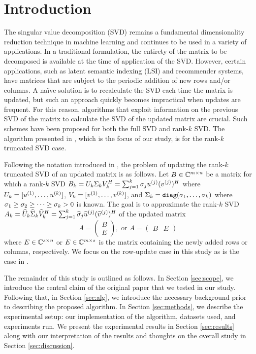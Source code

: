 
\section{Introduction} \label{sec:intro}

The singular value decomposition (SVD) remains a fundamental dimensionality reduction technique in machine learning and continues to be used in a variety of applications.
In a traditional formulation, the entirety of the matrix to be decomposed is available at the time of application of the SVD. However, certain applications, such as latent semantic indexing (LSI) and recommender systems, have matrices that are subject to the periodic addition of new rows and/or columns.
A na\"{i}ve solution is to recalculate the SVD each time the matrix is updated, but such an approach quickly becomes impractical when updates are frequent.
For this reason, algorithms that exploit information on the previous SVD of the matrix to calculate the SVD of the updated matrix are crucial.
Such schemes have been proposed for both the full SVD and rank-$k$ SVD.
The algorithm presented in \cite{Kalantzis2021}, which is the focus of our study, is for the rank-$k$ truncated SVD case.

Following the notation introduced in \cite{Kalantzis2021}, the problem of updating the rank-$k$ truncated SVD of an updated matrix is as follows.
Let $B\in\mathbb{C}^{m\times n}$ be a matrix for which a rank-$k$ SVD $B_k = U_k \Sigma_k V_k^H = \sum_{j=1}^k \sigma_{j} u^{(j)} (v^{(j)})^H$ where $U_k = [u^{(1)}, \dots, u^{(k)}]$, $V_k = [v^{(1)}, \dots, v^{(k)}]$, and $\Sigk = \verb|diag| (\sigj{1}, \dots, \sigj{k})$ where $\sigma_{1} \geq \sigma_{2} \geq \dots \geq \sigma_{k} > 0$ is known.
The goal is to approximate the rank-$k$ SVD $A_k = {\widehat{U}}_k {\widehat{\Sigma}}_k {\widehat{V}}_k^H = \sum_{j=1}^k \widehat{\sigma}_{j} \widehat{u}^{(j)} (\widehat{v}^{(j)})^H$ of the updated matrix
\begin{equation*}
    A= 
    \begin{pmatrix}
        B \\ E
    \end{pmatrix},\text{ or }
    A=
    \begin{pmatrix}
        B & E
    \end{pmatrix}
\end{equation*}
where $E\in\mathbb{C}^{s\times n}$ or $E\in\mathbb{C}^{m\times s}$ is the matrix containing the newly added rows or columns, respectively.
We focus on the row-update case in this study as is the case in \cite{Kalantzis2021}.

The remainder of this study is outlined as follows.
In Section \ref{sec:scope}, we introduce the central claim of the original paper that we tested in our study.
Following that, in Section \ref{sec:alg}, we introduce the necessary background prior to describing the proposed algorithm.
In Section \ref{sec:methods}, we describe the experimental setup: our implementation of the algorithm, datasets used, and experiments run.
We present the experimental results in Section \ref{sec:results} along with our interpretation of the results and thoughts on the overall study in Section \ref{sec:discussion}.
